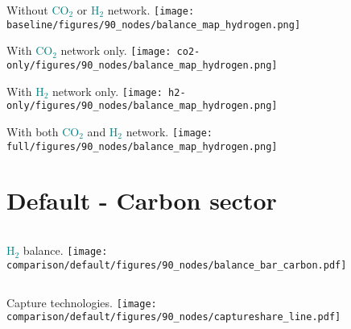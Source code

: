 \documentclass[12pt, aspectratio=169]{beamer}
\newcommand{\carbon}{\textcolor{teal}{CO$_2$}}
\newcommand{\hydrogen}{\textcolor{teal}{H$_2$}}
\begin{document}
\begin{frame}
    \begin{center}
    Without \carbon{} or \hydrogen{} network.
    \texttt{[image: baseline/figures/90\_nodes/balance\_map\_hydrogen.png]}
    \end{center}
\end{frame}


\begin{frame}
    \begin{center}
    With \carbon{} network only.
    \texttt{[image: co2-only/figures/90\_nodes/balance\_map\_hydrogen.png]}
    \end{center}
\end{frame}

\begin{frame}
    \begin{center}
    With \hydrogen{} network only.
    \texttt{[image: h2-only/figures/90\_nodes/balance\_map\_hydrogen.png]}
    \end{center}
\end{frame}


\begin{frame}
    \begin{center}
    With both \carbon{}  and \hydrogen{} network.
    \texttt{[image: full/figures/90\_nodes/balance\_map\_hydrogen.png]}
    \end{center}
\end{frame}






\section*{Default - Carbon sector}

\begin{frame}
    \begin{columns}
        \hydrogen{} balance.
        \texttt{[image: comparison/default/figures/90\_nodes/balance\_bar\_carbon.pdf]}
    \end{columns}
\end{frame}

\begin{frame}
    \begin{columns}
        Capture technologies.
        \texttt{[image: comparison/default/figures/90\_nodes/captureshare\_line.pdf]}
    \end{columns}
\end{frame}
\end{document}
